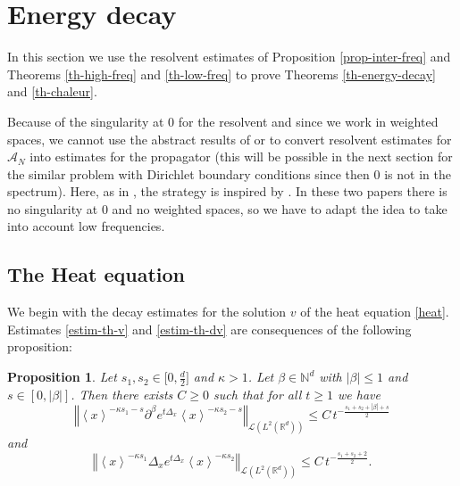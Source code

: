 \documentclass[10pt, a4paper,reqno]{amsart}
\theoremstyle{plain}
\newtheorem{proposition}[theorem]{Proposition}
\theoremstyle{definition}
\theoremstyle{remark}
\begin{document}
\section{Energy decay} \label{sec-energy-decay}

In this section we use the resolvent estimates of Proposition \ref{prop-inter-freq} and Theorems \ref{th-high-freq} and \ref{th-low-freq} to prove Theorems \ref{th-energy-decay} and \ref{th-chaleur}. 

Because of the singularity at 0 for the resolvent and since we work in weighted spaces, we cannot use the abstract results of \cite{BorichevTo10} or \cite{Batty-Ch-To} to convert resolvent estimates for ${{{\mathcal A}}_N}$ into estimates for the propagator (this will be possible in the next section for the similar problem with Dirichlet boundary conditions since then 0 is not in the spectrum). Here, as in \cite{Burq-Hi-07}, the strategy is inspired by \cite{lebeau96}. In these two papers there is no singularity at 0 and no weighted spaces, so we have to adapt the idea to take into account low frequencies.

\subsection{The Heat equation}

We begin with the decay estimates for the solution $v$ of the heat equation \eqref{heat}. Estimates \eqref{estim-th-v} and \eqref{estim-th-dv} are consequences of the following proposition:

\begin{proposition} \label{prop-heat-decay}
Let $s_1,s_2 \in \big[ 0, \frac d 2 \big]$ and ${\kappa} > 1$. Let ${\beta} \in {\mathbb{N}}^d$ with ${\left\vert {\beta}\right\vert} {\leqslant} 1$ and $s \in [0,{\left\vert {\beta}\right\vert}]$. Then there exists $C {\geqslant} 0$ such that for all $t {\geqslant} 1$ we have 
\[
{\left\Vert {{\left< x \right>}^{-{\kappa} s_1 - s} \partial^{\beta} e^{t{{\Delta}_x} } {\left< x \right>}^{- {\kappa} s_2 - s}}\right\Vert}_{{{\mathcal L}}(L^2({\mathbb{R}}^d))} {\leqslant} C \, t^{-\frac {s_1 + s_2 + {\left\vert {\beta}\right\vert} + s} 2}
\]
and
\[
{\left\Vert {{\left< x \right>}^{-{\kappa} s_1} {{\Delta}_x} e^{t{{\Delta}_x}} {\left< x \right>}^{-{\kappa} s_2}}\right\Vert}_{{{\mathcal L}}(L^2({\mathbb{R}}^d))} {\leqslant} C \, t^{-\frac {s_1 + s_2 + 2} 2}.
\]
\end{proposition}
\end{document}

